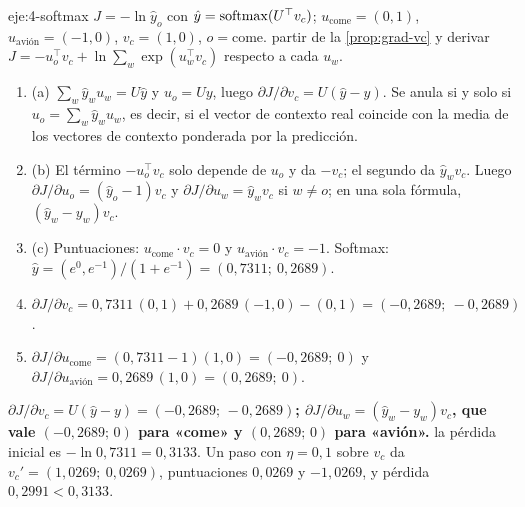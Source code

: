 \begin{solucion}{eje:4-softmax}
\datos $J=-\ln\hat y_o$ con $\hat y=\operatorname{softmax}(U^{\top}v_c)$; $u_{\text{come}}=(0,1)$, $u_{\text{avión}}=(-1,0)$, $v_c=(1,0)$, $o=\text{come}$.
\planteamiento partir de la \cref{prop:grad-vc} y derivar $J=-u_o^{\top}v_c+\ln\sum_w\exp(u_w^{\top}v_c)$ respecto a cada $u_w$.
\pasos
\begin{enumerate}[label=\arabic*.]
  \item (a) $\sum_w\hat y_w u_w=U\hat y$ y $u_o=Uy$, luego $\partial J/\partial v_c=U(\hat y-y)$. Se anula si y solo si $u_o=\sum_w\hat y_w u_w$, es decir, si el vector de contexto real coincide con la media de los vectores de contexto ponderada por la predicción.
  \item (b) El término $-u_o^{\top}v_c$ solo depende de $u_o$ y da $-v_c$; el segundo da $\hat y_w v_c$. Luego $\partial J/\partial u_o=(\hat y_o-1)v_c$ y $\partial J/\partial u_w=\hat y_w v_c$ si $w\neq o$; en una sola fórmula, $(\hat y_w-y_w)v_c$.
  \item (c) Puntuaciones: $u_{\text{come}}\cdot v_c=0$ y $u_{\text{avión}}\cdot v_c=-1$. Softmax: $\hat y=(e^{0},e^{-1})/(1+e^{-1})=(0{,}7311;\ 0{,}2689)$.
  \item $\partial J/\partial v_c=0{,}7311\,(0,1)+0{,}2689\,(-1,0)-(0,1)=(-0{,}2689;\ -0{,}2689)$.
  \item $\partial J/\partial u_{\text{come}}=(0{,}7311-1)(1,0)=(-0{,}2689;\ 0)$ y $\partial J/\partial u_{\text{avión}}=0{,}2689\,(1,0)=(0{,}2689;\ 0)$.
\end{enumerate}
\resultado \textbf{$\partial J/\partial v_c=U(\hat y-y)=(-0{,}2689;\,-0{,}2689)$; $\partial J/\partial u_w=(\hat y_w-y_w)v_c$, que vale $(-0{,}2689;\,0)$ para «come» y $(0{,}2689;\,0)$ para «avión».}
\comprobacion la pérdida inicial es $-\ln 0{,}7311=0{,}3133$. Un paso con $\eta=0{,}1$ sobre $v_c$ da $v_c'=(1{,}0269;\ 0{,}0269)$, puntuaciones $0{,}0269$ y $-1{,}0269$, y pérdida $0{,}2991<0{,}3133$.
\end{solucion}

